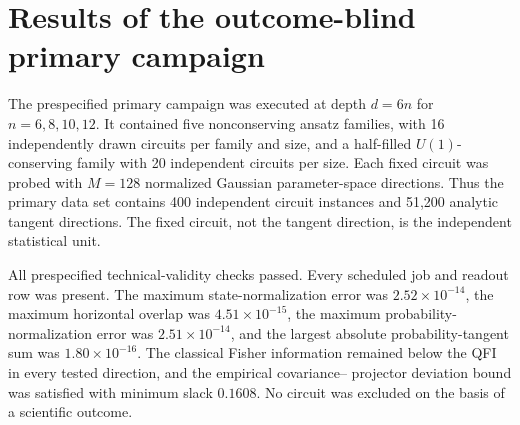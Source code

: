 
\section{Results of the outcome-blind primary campaign}
\label{sec:results-v2}

The prespecified primary campaign was executed at depth $d=6n$ for
$n=6,8,10,12$.  It contained five nonconserving ansatz families, with
16 independently drawn circuits per family and size, and a half-filled
$U(1)$-conserving family with 20 independent circuits per size.  Each
fixed circuit was probed with $M=128$ normalized Gaussian parameter-space
directions.  Thus the primary data set contains 400 independent circuit
instances and 51,200 analytic tangent directions.  The fixed circuit,
not the tangent direction, is the independent statistical unit.

All prespecified technical-validity checks passed.  Every scheduled job
and readout row was present.  The maximum state-normalization error was
$2.52\times10^{-14}$, the maximum horizontal overlap was
$4.51\times10^{-15}$, the maximum probability-normalization error was
$2.51\times10^{-14}$, and the largest absolute probability-tangent sum
was $1.80\times10^{-16}$.  The classical Fisher information remained
below the QFI in every tested direction, and the empirical covariance--
projector deviation bound was satisfied with minimum slack $0.1608$.
No circuit was excluded on the basis of a scientific outcome.

